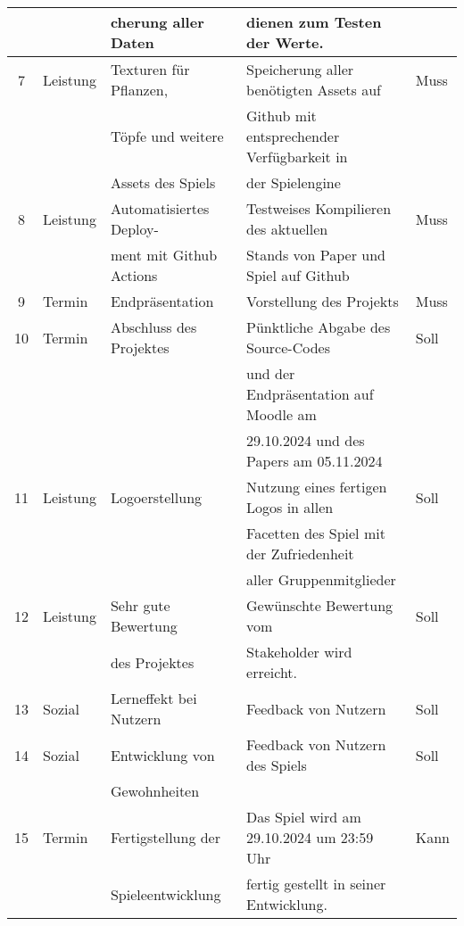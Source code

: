 \begin{table}[H]
\begin{tabular}{|c|l|l|l|l|}
        && cherung aller Daten & dienen zum Testen der Werte. &\\
        \hline
        7 & Leistung & Texturen für Pflanzen, & Speicherung aller benötigten Assets auf & Muss\\
        && Töpfe und weitere & Github mit entsprechender Verfügbarkeit in &\\
        && Assets des Spiels & der Spielengine &\\
        \hline
        8 & Leistung & Automatisiertes Deploy- & Testweises Kompilieren des aktuellen & Muss\\
        && ment mit Github Actions & Stands von Paper und Spiel auf Github&\\
        \hline
        9 & Termin & Endpräsentation & Vorstellung des Projekts & Muss\\
        \hline
        10 & Termin & Abschluss des Projektes & Pünktliche Abgabe des Source-Codes & Soll\\
        &&& und der Endpräsentation auf Moodle am &\\
        &&& 29.10.2024 und des Papers am 05.11.2024&\\
        \hline
        11 & Leistung & Logoerstellung & Nutzung eines fertigen Logos in allen & Soll\\
        &&& Facetten des Spiel mit der Zufriedenheit &\\
        &&& aller Gruppenmitglieder &\\
        \hline
        12 & Leistung & Sehr gute Bewertung & Gewünschte Bewertung vom & Soll\\
        &&  des Projektes & Stakeholder wird erreicht.&\\
        \hline
        13 & Sozial & Lerneffekt bei Nutzern& Feedback von Nutzern & Soll\\
        \hline
        14 & Sozial & Entwicklung von  & Feedback von Nutzern des Spiels & Soll\\
        && Gewohnheiten&&\\
        \hline
        15 & Termin & Fertigstellung der & Das Spiel wird am 29.10.2024 um 23:59 Uhr & Kann\\
        && Spieleentwicklung & fertig gestellt in seiner Entwicklung. &\\
        \hline
    \end{tabular}\label{tab:projektziele}
\end{table}
